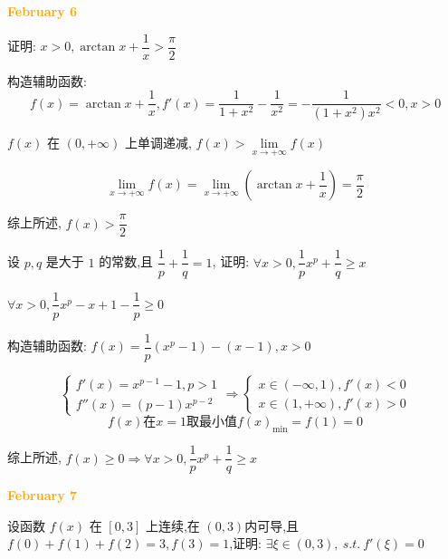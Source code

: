 \textcolor{orange}{\textbf{February 6}}

\begin{example}[][Exam: 28.1.11]
	证明: $x > 0,\arctan x+\dfrac{1}{x}>\dfrac{\pi}{2}$
\end{example}
\begin{solution}

	构造辅助函数: 
	$$f(x) = \arctan x +\dfrac{1}{x}, f'(x) = \dfrac{1}{1+x^{2}}-\dfrac{1}{x^{2}} = -\dfrac{1}{(1+x^{2})x^{2}} < 0, x>0$$

	$f(x)$ 在 $(0,+\infty)$ 上单调递减, $f(x) > \lim\limits_{x\to +\infty}f(x)$

	$$\lim\limits_{x\to +\infty}f(x) = \lim\limits_{x\to +\infty}(\arctan x +\dfrac{1}{x}) =\dfrac{\pi}{2}$$

	综上所述, $f(x) > \dfrac{\pi}{2}$
\end{solution}

\begin{example}[][Exam: 28.1.12]
	设 $p,q$ 是大于 $1$ 的常数,且 $\dfrac{1}{p}+\dfrac{1}{q}=1$,
	证明: $\forall x>0, \dfrac{1}{p}x^{p}+\dfrac{1}{q}\geq x$
\end{example}

\begin{solution}

	$\forall x > 0, \dfrac{1}{p}x^{p} -x +1-\dfrac{1}{p} \geq 0$
	
	构造辅助函数: $f(x) = \dfrac{1}{p}(x^{p}-1) - (x-1), x > 0$

	$$\begin{cases}
		f'(x) = x^{p-1}-1, p > 1\\
		f''(x) = (p-1)x^{p-2}
	\end{cases}\Rightarrow 
	\begin{cases}
		x\in (-\infty,1), f'(x) < 0\\
		x\in(1,+\infty), f'(x) > 0
	\end{cases}$$
	$$f(x)\text{在} x=1\text{取最小值} f(x)_{\min} = f(1) =0$$

	综上所述, $f(x)\geq 0\Rightarrow \forall x > 0, \dfrac{1}{p}x^{p}+\dfrac{1}{q}\geq x$
\end{solution}

\textcolor{orange}{\textbf{February 7}}

\begin{example}[][Exam: 28.1.13]
	设函数 $f(x)$ 在 $[0,3]$ 上连续,在 $(0,3)$内可导,且 $f(0)+f(1)+f(2)=3,f(3)=1$,证明: $\exists \xi\in(0,3),\ s.t.\ f'(\xi)=0$
\end{example}
 
